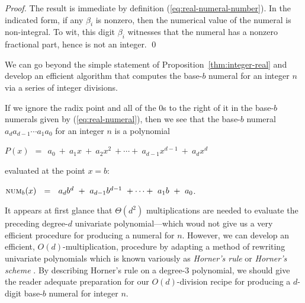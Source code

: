 \begin{proof}
The result is immediate by definition (\ref{eq:real-numeral-number}).
In the indicated form, if any $\beta_i$ is nonzero, then the numerical
value of the numeral is non-integral.  To wit, this digit $\beta_i$
witnesses that the numeral has a nonzero fractional part, hence is not
an integer.  \qed
\end{proof}

We can go beyond the simple statement of
Proposition~\ref{thm:integer-real} and develop an efficient algorithm
that computes the base-$b$ numeral for an integer $n$ via a series of
integer divisions.

\bigskip

%
If we ignore the radix point and all of the $0$s to the right of it in
the base-$b$ numerals given by (\ref{eq:real-numeral}), then we see
that the base-$b$ numeral $a_d a_{d-1} \cdots a_1 a_0$ for an integer
$n$ is a polynomial

$P(x) \ \ = \ \ a_0 \ + \ a_1 x \ + \ a_2 x^2 \ + \cdots + \ a_{d-1}
x^{d-1} \ + \ a_d x^d$

\noindent
evaluated at the point $x=b$:

$\mbox{\sc num}_{b}(x) \ \ = \ \ a_d b^d \ + \ a_{d-1} b^{d-1} \ +
\cdots + \ a_1 b \ + \ a_0$.

\noindent
It appears at first glance that $\Theta(d^2)$ multiplications are
needed to evaluate the preceding degree-$d$ univariate
polynomial---which woud not give us a very efficient procedure for
producing a numeral for $n$.  However, we can develop an efficient,
$O(d)$-multiplication, procedure by adapting a method of rewriting
univariate polynomials which is known variously as {\it Horner's rule}
or {\it Horner's scheme} \cite{Horner}. 
 By describing Horner's rule on a degree-$3$
polynomial, we should give the reader adequate preparation for our
$O(d)$-division recipe for producing a $d$-digit base-$b$ numeral for
integer $n$.

\medskip

